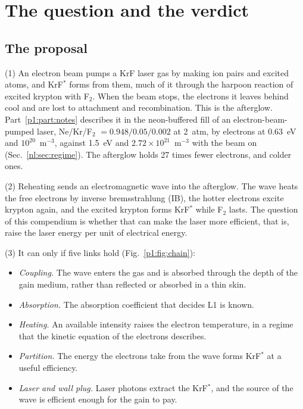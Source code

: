 
\chapter{The question and the verdict}
\label{p1:chap:verdict}

\section{The proposal}
\label{p1:sec:proposal}

{\noindent}(1) An electron beam pumps a KrF laser gas by making ion pairs and
excited atoms, and KrF$^*$ forms from them, much of it through the harpoon
reaction of excited krypton with F$_2$. When the beam stops, the electrons it
leaves behind cool and are lost to attachment and recombination. This is the
afterglow. Part~\ref{p1:part:notes} describes it in the neon-buffered fill of an
electron-beam-pumped laser, Ne/Kr/F$_2$ $=0.948/0.05/0.002$ at 2~atm, by
electrons at 0.63~eV and $10^{20}$~m$^{-3}$, against 1.5~eV and
$2.72\times10^{21}$~m$^{-3}$ with the beam on (Sec.~\ref{nl:sec:regime}). The
afterglow holds 27 times fewer electrons, and colder ones.

{\noindent}(2) Reheating sends an electromagnetic wave into the afterglow. The wave
heats the free electrons by inverse bremsstrahlung (IB), the hotter electrons
excite krypton again, and the excited krypton forms KrF$^*$ while F$_2$ lasts. The
question of this compendium is whether that can make the laser more efficient,
that is, raise the laser energy per unit of electrical energy.

{\noindent}(3) It can only if five links hold (Fig.~\ref{p1:fig:chain}):
\begin{itemize}
\item[L1] \emph{Coupling.} The wave enters the gas and is absorbed through the
  depth of the gain medium, rather than reflected or absorbed in a thin skin.
\item[L2] \emph{Absorption.} The absorption coefficient that decides L1 is known.
\item[L3] \emph{Heating.} An available intensity raises the electron temperature,
  in a regime that the kinetic equation of the electrons describes.
\item[L4] \emph{Partition.} The energy the electrons take from the wave forms
  KrF$^*$ at a useful efficiency.
\item[L5] \emph{Laser and wall plug.} Laser photons extract the KrF$^*$, and the
  source of the wave is efficient enough for the gain to pay.
\end{itemize}


